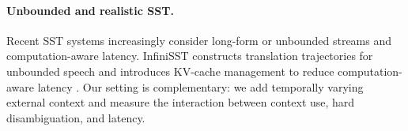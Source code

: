 \paragraph{Unbounded and realistic SST.}
Recent SST systems increasingly consider long-form or unbounded streams and computation-aware latency.  InfiniSST constructs translation trajectories for unbounded speech and introduces KV-cache management to reduce computation-aware latency \citep{ouyang2025infinisst}.  Our setting is complementary: we add temporally varying external context and measure the interaction between context use, hard disambiguation, and latency.
